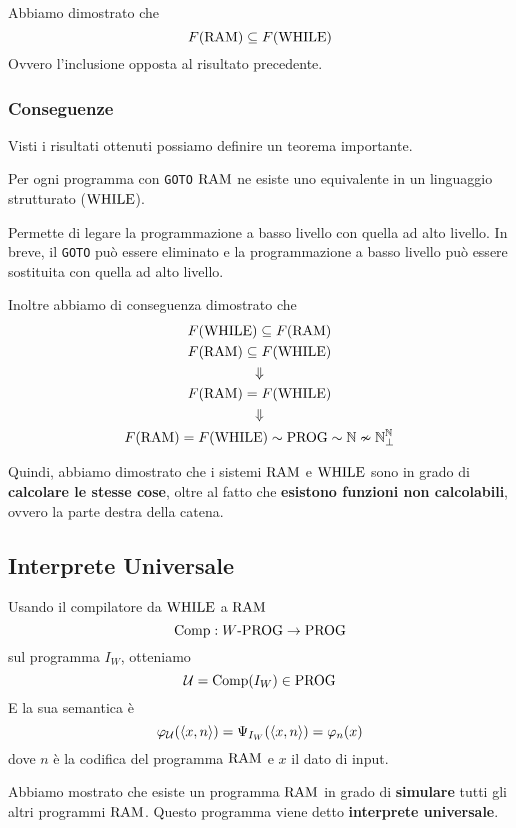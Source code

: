 Abbiamo dimostrato che
$$ F(\text{RAM}) \subseteq F(\text{WHILE}) $$
Ovvero l'inclusione opposta al risultato precedente.

\subsubsection{Conseguenze}

Visti i risultati ottenuti possiamo definire un teorema importante.\\

\begin{theor}
	Per ogni programma con \texttt{GOTO} $\text{RAM}$ ne esiste uno equivalente in un linguaggio strutturato ($\text{WHILE}$).
\end{theor}

Permette di legare la programmazione a basso livello con quella ad alto livello. In breve, il \texttt{GOTO} può essere eliminato e la programmazione a basso livello può essere sostituita con quella ad alto livello.

Inoltre abbiamo di conseguenza dimostrato che
\begin{gather*}
	F(\text{WHILE}) \subseteq F(\text{RAM}) \\
	F (\text{RAM}) \subseteq F(\text{WHILE}) \\
	\Downarrow \\
	F(\text{RAM}) = F(\text{WHILE}) \\
	\Downarrow \\
	F(\text{RAM}) = F(\text{WHILE}) \sim \text{PROG} \sim \mathbb{N} \nsim \mathbb{N}^\mathbb{N}_\bot
\end{gather*}

Quindi, abbiamo dimostrato che i sistemi $\text{RAM}$ e $\text{WHILE}$ sono in grado di \textbf{calcolare le stesse cose}, oltre al fatto che \textbf{esistono funzioni non calcolabili}, ovvero la parte destra della catena.

\subsection{Interprete Universale}

Usando il compilatore da $\text{WHILE}$ a $\text{RAM}$
$$ \text{Comp}: W\text{-PROG} \rightarrow \text{PROG} $$
sul programma $I_W$, otteniamo
$$ \mathcal{U} = \text{Comp}(I_W) \in \text{PROG} $$
E la sua semantica è 
$$ \varphi_{\mathcal{U}} (\langle x,n \rangle) = \Psi_{I_W} (\langle x,n \rangle) = \varphi_n(x) $$
dove $n$ è la codifica del programma $\text{RAM}$ e $x$ il dato di input.

Abbiamo mostrato che esiste un programma $\text{RAM}$ in grado di \textbf{simulare} tutti gli altri programmi $\text{RAM}$. Questo programma viene detto \textbf{interprete universale}.

